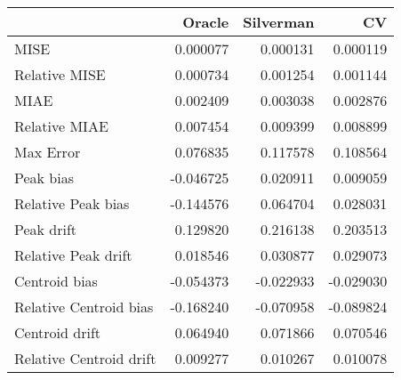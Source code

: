 \begin{tabular}{lrrr}
  \hline
 & Oracle & Silverman & CV \\ 
  \hline
MISE & 0.000077 & 0.000131 & 0.000119 \\ 
  Relative MISE & 0.000734 & 0.001254 & 0.001144 \\ 
  MIAE & 0.002409 & 0.003038 & 0.002876 \\ 
  Relative MIAE & 0.007454 & 0.009399 & 0.008899 \\ 
  Max Error & 0.076835 & 0.117578 & 0.108564 \\ 
  Peak bias & -0.046725 & 0.020911 & 0.009059 \\ 
  Relative Peak bias & -0.144576 & 0.064704 & 0.028031 \\ 
  Peak drift & 0.129820 & 0.216138 & 0.203513 \\ 
  Relative Peak drift & 0.018546 & 0.030877 & 0.029073 \\ 
  Centroid bias & -0.054373 & -0.022933 & -0.029030 \\ 
  Relative Centroid bias & -0.168240 & -0.070958 & -0.089824 \\ 
  Centroid drift & 0.064940 & 0.071866 & 0.070546 \\ 
  Relative Centroid drift & 0.009277 & 0.010267 & 0.010078 \\ 
   \hline
\end{tabular}
